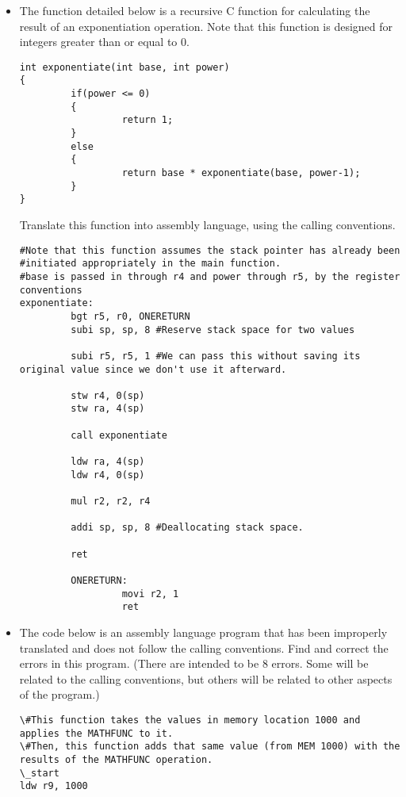 \documentclass[10pt]{article}
\begin{document}
\begin{itemize}

\setlength\itemsep{10mm}


\item The function detailed below is a recursive C function for calculating the result of an exponentiation operation.  Note that this function is designed for integers greater than or equal to 0.
    \begin{verbatim}
int exponentiate(int base, int power)
{
         if(power <= 0)
         {
                  return 1;
         }
         else
         {
                  return base * exponentiate(base, power-1);
         }
}
    \end{verbatim}

Translate this function into assembly language, using the calling conventions.  

\newpage

    \begin{verbatim}
#Note that this function assumes the stack pointer has already been 
#initiated appropriately in the main function.
#base is passed in through r4 and power through r5, by the register conventions
exponentiate:
         bgt r5, r0, ONERETURN
         subi sp, sp, 8 #Reserve stack space for two values

         subi r5, r5, 1 #We can pass this without saving its original value since we don't use it afterward.

         stw r4, 0(sp)
         stw ra, 4(sp)

         call exponentiate

         ldw ra, 4(sp)
         ldw r4, 0(sp)

         mul r2, r2, r4

         addi sp, sp, 8 #Deallocating stack space.

         ret

         ONERETURN:
                  movi r2, 1
                  ret
    \end{verbatim}



\newpage
\item The code below is an assembly language program that has been improperly translated and does not follow the calling conventions.  Find and correct the errors in this program.  (There are intended to be 8 errors.  Some will be related to the calling conventions, but others will be related to other aspects of the program.)
    \begin{verbatim}
\#This function takes the values in memory location 1000 and applies the MATHFUNC to it.
\#Then, this function adds that same value (from MEM 1000) with the results of the MATHFUNC operation.
\_start
ldw r9, 1000


\end{verbatim}
\end{itemize}
\end{document}
